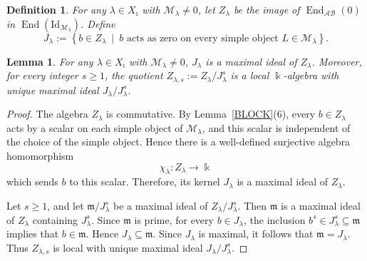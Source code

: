 \documentclass[a4,10pt]{amsart}
\numberwithin{equation}{section}
\def\End{\operatorname{End}}
\newtheorem{Lemma}[Theorem]{Lemma}
\newtheorem{Defn}[Theorem]{Definition}
\theoremstyle{definition}
\newcommand{\AB}{\mathcal{AB}}
\begin{document}
 \begin{Defn} For  any $\lambda\in X_{\imath}$ with $\mathcal M_\lambda\neq 0$, let $Z_\lambda$ be the image of $\End_{\AB}(0)$ in  $\End(\text{Id}_{\mathcal M_\lambda})$. %
Define
\[
 J_\lambda
 :=
 \left\{
 b\in Z_\lambda
 \ \middle|\
 b\text{ acts as zero on every simple object }
 L\in\mathcal M_\lambda
 \right\}.
 \]
\end{Defn} 

 \begin{Lemma}\label{lem:localring}  For  any $\lambda\in X_{\imath}$ with $\mathcal M_\lambda\neq 0$,   $J_\lambda$ is a maximal ideal of $Z_\lambda$. Moreover, for every
 integer $s\geq 1$, the quotient
 \(
 Z_{\lambda,s}:=Z_\lambda/J_\lambda^s
 \)
 is a local $\Bbbk$-algebra with unique maximal ideal
 $J_\lambda/J_\lambda^s$.
 \end{Lemma}

 \begin{proof}
 The algebra $Z_\lambda$ is commutative. By Lemma~\ref{BLOCK}(6), every
 $b\in Z_\lambda$ acts by a scalar on each simple object of
 $\mathcal M_\lambda$, and this scalar is independent of the choice of
 the simple object. Hence there is a well-defined surjective algebra
 homomorphism
 \[
 \chi_\lambda:Z_\lambda\longrightarrow\Bbbk
 \]
 which sends $b$ to this scalar.  Therefore, its kernel $J_\lambda$ is a maximal ideal of $Z_\lambda$.

 Let $s\geq 1$, and let $\mathfrak m/J_\lambda^s$ be a maximal ideal of
 $Z_\lambda/J_\lambda^s$. Then $\mathfrak m$ is a maximal ideal of
 $Z_\lambda$ containing $J_\lambda^s$. Since $\mathfrak m$ is prime,
 for every $b\in J_\lambda$, the inclusion
 \(
 b^s\in J_\lambda^s\subseteq\mathfrak m
 \)
 implies that $b\in\mathfrak m$. Hence
 $J_\lambda\subseteq\mathfrak m$. Since $J_\lambda$ is maximal, it
 follows that $\mathfrak m=J_\lambda$. Thus $Z_{\lambda,s}$ is local
 with unique maximal ideal $J_\lambda/J_\lambda^s$.
 \end{proof}
\end{document}
